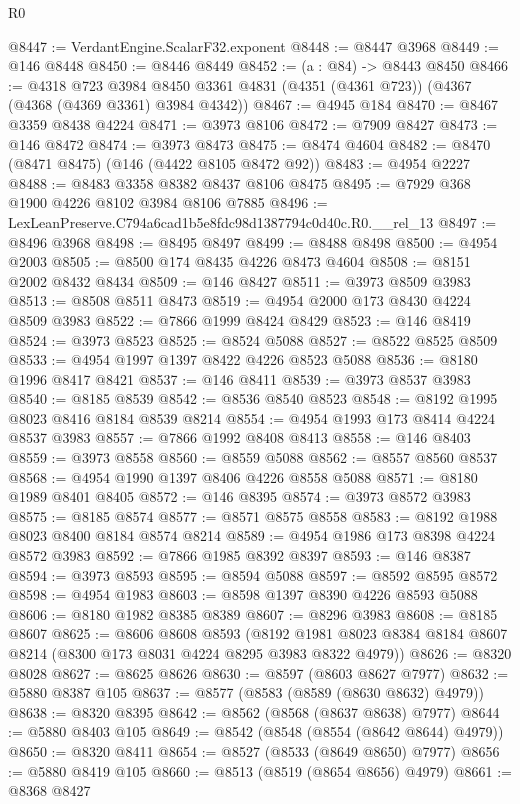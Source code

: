\begin{lexlean}{R0}
\begin{coremodule}
@8447 := VerdantEngine.ScalarF32.exponent
@8448 := @8447 @3968
@8449 := @146 @8448
@8450 := @8446 @8449
@8452 := (a : @84) -> @8443 @8450
@8466 := @4318
    @723
    @3984
    @8450
    @3361
    @4831
    (@4351 (@4361 @723))
    (@4367 (@4368 (@4369 @3361) @3984 @4342))
@8467 := @4945 @184
@8470 := @8467 @3359 @8438 @4224
@8471 := @3973 @8106
@8472 := @7909 @8427
@8473 := @146 @8472
@8474 := @3973 @8473
@8475 := @8474 @4604
@8482 := @8470 (@8471 @8475) (@146 (@4422 @8105 @8472 @92))
@8483 := @4954 @2227
@8488 := @8483 @3358 @8382 @8437 @8106 @8475
@8495 := @7929 @368 @1900 @4226 @8102 @3984 @8106 @7885
@8496 := LexLeanPreserve.C794a6cad1b5e8fdc98d1387794c0d40c.R0.__rel_13
@8497 := @8496 @3968
@8498 := @8495 @8497
@8499 := @8488 @8498
@8500 := @4954 @2003
@8505 := @8500 @174 @8435 @4226 @8473 @4604
@8508 := @8151 @2002 @8432 @8434
@8509 := @146 @8427
@8511 := @3973 @8509 @3983
@8513 := @8508 @8511 @8473
@8519 := @4954 @2000 @173 @8430 @4224 @8509 @3983
@8522 := @7866 @1999 @8424 @8429
@8523 := @146 @8419
@8524 := @3973 @8523
@8525 := @8524 @5088
@8527 := @8522 @8525 @8509
@8533 := @4954 @1997 @1397 @8422 @4226 @8523 @5088
@8536 := @8180 @1996 @8417 @8421
@8537 := @146 @8411
@8539 := @3973 @8537 @3983
@8540 := @8185 @8539
@8542 := @8536 @8540 @8523
@8548 := @8192 @1995 @8023 @8416 @8184 @8539 @8214
@8554 := @4954 @1993 @173 @8414 @4224 @8537 @3983
@8557 := @7866 @1992 @8408 @8413
@8558 := @146 @8403
@8559 := @3973 @8558
@8560 := @8559 @5088
@8562 := @8557 @8560 @8537
@8568 := @4954 @1990 @1397 @8406 @4226 @8558 @5088
@8571 := @8180 @1989 @8401 @8405
@8572 := @146 @8395
@8574 := @3973 @8572 @3983
@8575 := @8185 @8574
@8577 := @8571 @8575 @8558
@8583 := @8192 @1988 @8023 @8400 @8184 @8574 @8214
@8589 := @4954 @1986 @173 @8398 @4224 @8572 @3983
@8592 := @7866 @1985 @8392 @8397
@8593 := @146 @8387
@8594 := @3973 @8593
@8595 := @8594 @5088
@8597 := @8592 @8595 @8572
@8598 := @4954 @1983
@8603 := @8598 @1397 @8390 @4226 @8593 @5088
@8606 := @8180 @1982 @8385 @8389
@8607 := @8296 @3983
@8608 := @8185 @8607
@8625 := @8606
    @8608
    @8593
    (@8192 @1981 @8023 @8384 @8184 @8607 @8214 (@8300 @173 @8031 @4224 @8295 @3983 @8322 @4979))
@8626 := @8320 @8028
@8627 := @8625 @8626
@8630 := @8597 (@8603 @8627 @7977)
@8632 := @5880 @8387 @105
@8637 := @8577 (@8583 (@8589 (@8630 @8632) @4979))
@8638 := @8320 @8395
@8642 := @8562 (@8568 (@8637 @8638) @7977)
@8644 := @5880 @8403 @105
@8649 := @8542 (@8548 (@8554 (@8642 @8644) @4979))
@8650 := @8320 @8411
@8654 := @8527 (@8533 (@8649 @8650) @7977)
@8656 := @5880 @8419 @105
@8660 := @8513 (@8519 (@8654 @8656) @4979)
@8661 := @8368 @8427

\end{coremodule}
\end{lexlean}
